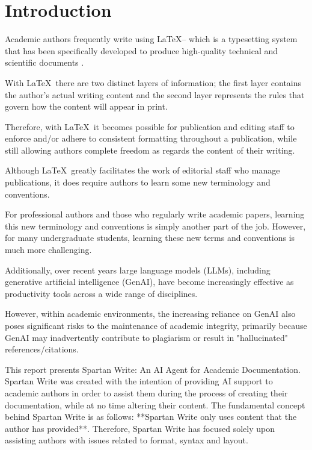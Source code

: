 \section{Introduction}

Academic authors frequently write using \LaTeX -- which is a typesetting system that has been specifically developed to produce high-quality technical and scientific documents \cite{latex}.

With \LaTeX\ there are two distinct layers of information; the first layer contains the author's actual writing content and the second layer represents the rules that govern how the content will appear in print.

Therefore, with \LaTeX\ it becomes possible for publication and editing staff to enforce and/or adhere to consistent formatting throughout a publication, while still allowing authors complete freedom as regards the content of their writing.

Although \LaTeX\ greatly facilitates the work of editorial staff who manage publications, it does require authors to learn some new terminology and conventions.

For professional authors and those who regularly write academic papers, learning this new terminology and conventions is simply another part of the job.
However, for many undergraduate students, learning these new terms and conventions is much more challenging.

Additionally, over recent years large language models (LLMs), including generative artificial intelligence (GenAI), have become increasingly effective as productivity tools across a wide range of disciplines.

However, within academic environments, the increasing reliance on GenAI also poses significant risks to the maintenance of academic integrity, primarily because GenAI may inadvertently contribute to plagiarism or result in "hallucinated" references/citations.

This report presents Spartan Write: An AI Agent for Academic Documentation.
Spartan Write was created with the intention of providing AI support to academic authors in order to assist them during the process of creating their documentation, while at no time altering their content.
The fundamental concept behind Spartan Write is as follows: **Spartan Write only uses content that the author has provided**.
Therefore, Spartan Write has focused solely upon assisting authors with issues related to format, syntax and layout.

